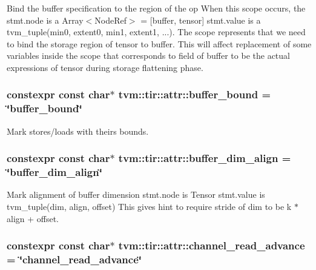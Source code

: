 Bind the buffer specification to the region of the op When this scope occurs, the stmt.\+node is a Array$<$\+Node\+Ref$>$ = \mbox{[}buffer, tensor\mbox{]} stmt.\+value is a tvm\+\_\+tuple(min0, extent0, min1, extent1, ...). The scope represents that we need to bind the storage region of tensor to buffer. This will affect replacement of some variables inside the scope that corresponds to field of buffer to be the actual expressions of tensor during storage flattening phase. 

\subsubsection[{\texorpdfstring{buffer\+\_\+bound}{buffer_bound}}]{\setlength{\rightskip}{0pt plus 5cm}constexpr const char$\ast$ tvm\+::tir\+::attr\+::buffer\+\_\+bound = \char`\"{}buffer\+\_\+bound\char`\"{}}\hypertarget{namespacetvm_1_1tir_1_1attr_ac76fd8d0227265617e2f2bb8402d1e19}{}\label{namespacetvm_1_1tir_1_1attr_ac76fd8d0227265617e2f2bb8402d1e19}


Mark stores/loads with theirs bounds. 

\subsubsection[{\texorpdfstring{buffer\+\_\+dim\+\_\+align}{buffer_dim_align}}]{\setlength{\rightskip}{0pt plus 5cm}constexpr const char$\ast$ tvm\+::tir\+::attr\+::buffer\+\_\+dim\+\_\+align = \char`\"{}buffer\+\_\+dim\+\_\+align\char`\"{}}\hypertarget{namespacetvm_1_1tir_1_1attr_a0ff3c4642eebe20842b1c26e98288a5d}{}\label{namespacetvm_1_1tir_1_1attr_a0ff3c4642eebe20842b1c26e98288a5d}


Mark alignment of buffer dimension stmt.\+node is Tensor stmt.\+value is tvm\+\_\+tuple(dim, align, offset) This gives hint to require stride of dim to be k $\ast$ align + offset. 

\subsubsection[{\texorpdfstring{channel\+\_\+read\+\_\+advance}{channel_read_advance}}]{\setlength{\rightskip}{0pt plus 5cm}constexpr const char$\ast$ tvm\+::tir\+::attr\+::channel\+\_\+read\+\_\+advance = \char`\"{}channel\+\_\+read\+\_\+advance\char`\"{}}\hypertarget{namespacetvm_1_1tir_1_1attr_a14632ed9597f1c21a0dbd23949e5916e}{}\label{namespacetvm_1_1tir_1_1attr_a14632ed9597f1c21a0dbd23949e5916e}


